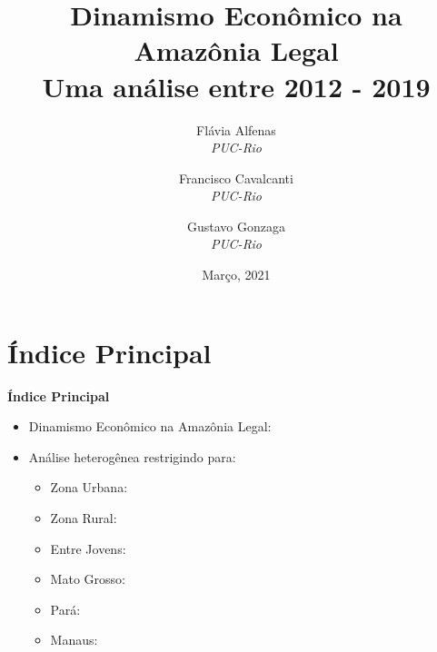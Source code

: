 \documentclass[8pt]{beamer}
\author{
Flávia  Alfenas\\
\textit{PUC-Rio}\\ \vspace{3mm}
\and  
Francisco Cavalcanti\\
\textit{PUC-Rio}\\ \vspace{3mm}
\and   
Gustavo Gonzaga \\
\textit{PUC-Rio} 
}
\date{Março, 2021}
\title{Dinamismo Econômico na Amazônia Legal \\ Uma análise entre 2012 - 2019}
\begin{document}

\begin{frame}
\titlepage
\end{frame}


\section{Índice Principal}

\begin{frame}[label=indice_principal]{}

\textbf{Índice Principal}
\vspace{2mm}
\begin{itemize}

\item{Dinamismo Econômico na Amazônia Legal: \hyperlink{indice_principal_amz}{}}
\vspace{3mm}

\item{Análise heterogênea restrigindo para:
	\begin{itemize}
	\item{Zona Urbana: \hyperlink{indice_principal_amz_urbana}{}}
	\vspace{1mm}

	\item{Zona Rural: \hyperlink{indice_principal_amz_rural}{}}
	\vspace{1mm}

	\item{Entre Jovens: \hyperlink{indice_principal_amz_mt}{}}
	\vspace{1mm}

	\item{Mato Grosso: \hyperlink{indice_principal_amz_mt}{}}
	\vspace{1mm}

	\item{Pará: \hyperlink{indice_principal_amz_pa}{}}
	\vspace{1mm}

	\item{Manaus: \hyperlink{indice_principal_amz_manaus}{}}
	\vspace{1mm}
	\end{itemize}
}

\end{itemize}

\end{frame}
\end{document}
